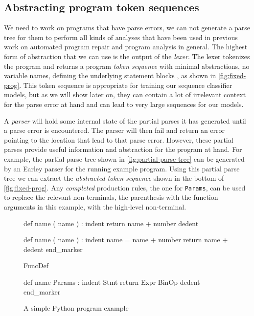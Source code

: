 \subsection{Abstracting program token sequences}
\label{sec:overview:abstraction}

We need to work on programs that have parse errors, \ie we can not generate a
parse tree for them to perform all kinds of analyses that have been used in
previous work on automated program repair \citep{Sakkas_2020,
Martinez_2013,Gulwani_2018, Wang_2018} and program analysis in general.
%
The highest form of abstraction that we can use is the output of the
\emph{lexer}. The lexer tokenizes the program and returns a program \emph{token
sequence} with minimal abstractions, \eg no variable names, defining the
underlying statement blocks \etc, as shown in \autoref{fig:fixed-prog}. This
token sequence is appropriate for training our sequence classifier models, but
as we will show later on, they can contain a lot of irrelevant context for the
parse error at hand and can lead to very large sequences for our models.

 A \emph{parser} will hold some
internal state of the partial parses it has generated until a parse error is
encountered. The parser will then fail and return an error pointing to the
location that lead to that parse error. However, these partial parses provide
useful information and abstraction for the program at hand. For example, the
partial parse tree shown in \autoref{fig:partial-parse-tree} can be generated by
an Earley parser for the running example program. Using this partial parse tree
we can extract the \emph{abstracted token sequence} shown in the bottom of
\autoref{fig:fixed-prog}. Any \emph{completed} production rules, \eg the
one for \texttt{Params}, can be used to replace the relevant non-terminals,
\eg the parenthesis with the function arguments in this example, with the
high-level non-terminal.

\begin{figure}[t]
\centering
\begin{minipage}[c]{0.54\linewidth}
\begin{ecode}
def name ( name ) : \n
indent return name + number \n
dedent \n

def name ( name ) : \n
indent name = name + number \n
return name + \n
dedent end_marker
\end{ecode}
\label{fig:prog-seq}
\end{minipage}%
\hspace{0.02\linewidth}%
\begin{minipage}[c]{0.44\linewidth}
\begin{ecode}
FuncDef \n

def name Params : \n
indent Stmt \n
return Expr BinOp \n
dedent end_marker
\end{ecode}
\label{fig:abstract-prog-seq}
\end{minipage}
\caption{A simple Python program example}
\end{figure}


